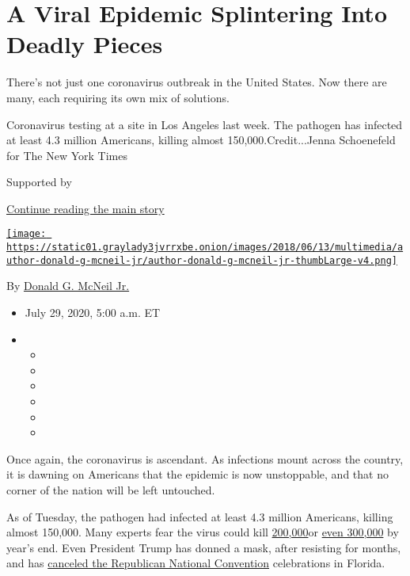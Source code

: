 \hypertarget{a-viral-epidemic-splintering-into-deadly-pieces}{%
\section{A Viral Epidemic Splintering Into Deadly
Pieces}\label{a-viral-epidemic-splintering-into-deadly-pieces}}

There's not just one coronavirus outbreak in the United States. Now
there are many, each requiring its own mix of solutions.

Coronavirus testing at a site in Los Angeles last week. The pathogen has
infected at least 4.3 million Americans, killing almost
150,000.Credit...Jenna Schoenefeld for The New York Times

Supported by

\protect\hyperlink{after-sponsor}{Continue reading the main story}

\href{https://www.nytimes3xbfgragh.onion/by/donald-g-mcneil-jr}{\texttt{[image: https://static01.graylady3jvrrxbe.onion/images/2018/06/13/multimedia/author-donald-g-mcneil-jr/author-donald-g-mcneil-jr-thumbLarge-v4.png]}}

By
\href{https://www.nytimes3xbfgragh.onion/by/donald-g-mcneil-jr}{Donald
G. McNeil Jr.}

\begin{itemize}
\item
  July 29, 2020, 5:00 a.m. ET
\item
  \begin{itemize}
  \item
  \item
  \item
  \item
  \item
  \item
  \end{itemize}
\end{itemize}

Once again, the coronavirus is ascendant. As infections mount across the
country, it is dawning on Americans that the epidemic is now
unstoppable, and that no corner of the nation will be left untouched.

As of Tuesday, the pathogen had infected at least 4.3 million Americans,
killing almost 150,000. Many experts fear the virus could kill
\href{https://www.forbes.com/sites/mattperez/2020/07/07/imhe-model-projects-208255-us-deaths-by-november-but-estimate-falls-sharply-if-mask-use-increases/\#3c8ee9616f2e}{200,000}or
\href{https://www.cnbc.com/2020/07/22/dr-scott-gottlieb-us-coronavirus-deaths-may-hit-300000-by-year-end.html}{even
300,000} by year's end. Even President Trump has donned a mask, after
resisting for months, and has
\href{https://www.nytimes3xbfgragh.onion/2020/07/23/us/politics/jacksonville-rnc.html}{canceled
the Republican National Convention} celebrations in Florida.


